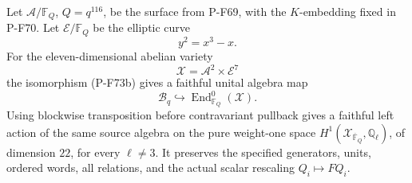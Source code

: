 \begin{proposition}
Let $\mathcal A/\mathbb F_Q$, $Q=q^{116}$, be the
surface from P-F69, with the $K$-embedding fixed in P-F70.
Let $\mathcal E/\mathbb F_Q$ be the elliptic curve
\[
                         y^2=x^3-x.
                                                               \tag{P-F73c}
\]
For the eleven-dimensional abelian variety
\[
                    \mathcal X=\mathcal A^2\times\mathcal E^7
                                                               \tag{P-F73d}
\]
the isomorphism (P-F73b) gives a faithful unital algebra map
\[
             \mathcal B_q\hookrightarrow
                         \operatorname{End}_{\mathbb F_Q}^0(\mathcal X).
                                                               \tag{P-F73e}
\]
Using blockwise transposition before contravariant pullback
gives a faithful left action of the same source algebra
on the pure weight-one space
$H^1(\mathcal X_{\overline{\mathbb F}_Q},\mathbb Q_\ell)$,
of dimension $22$, for every $\ell\ne3$.
It preserves the specified generators, units, ordered
words, all relations, and the actual scalar rescaling
$Q_i\mapsto FQ_i$.
\end{proposition}

